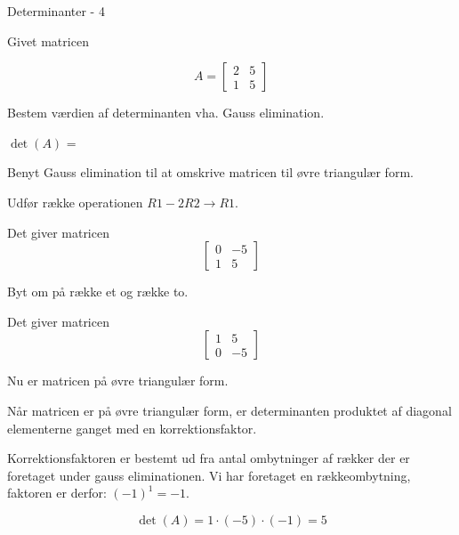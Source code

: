 \documentclass{article}
\begin{document}
\begin{exercise}{Determinanter - 4}

Givet matricen

\[
A = \left[\begin{array}{rr}
2 & 5 \\
1 & 5
\end{array} \right]
\]

Bestem værdien af determinanten vha. Gauss elimination.

$\det(A)$ = 

\hint
Benyt Gauss elimination til at omskrive matricen til
øvre triangulær form.

\hint
Udfør række operationen
$R1 - 2 R2 \to R1$.

\hint
Det giver matricen
\[
\left[\begin{array}{rr}
0 & -5 \\
1 & 5
\end{array} \right]
\]

\hint
Byt om på række et og række to.

\hint
Det giver matricen
\[
\left[\begin{array}{rr}
1 & 5 \\
0 & -5
\end{array} \right]
\]

\hint
Nu er matricen på øvre triangulær form.

\hint
Når matricen er på øvre triangulær form, er determinanten
produktet af diagonal elementerne ganget med en korrektionsfaktor.

\hint
Korrektionsfaktoren er bestemt ud fra antal ombytninger af rækker
der er foretaget under gauss eliminationen.
Vi har foretaget en rækkeombytning, faktoren er derfor: $(-1)^1 = -1$.

\hint
\[
\det(A) = 1 \cdot (-5) \cdot (-1) = 5
\]

\end{exercise}
\end{document}

